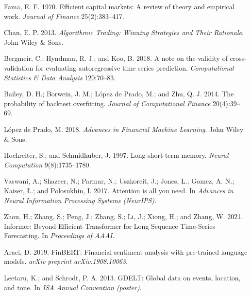\documentclass[letterpaper]{article} %
\begin{document}
\begin{thebibliography}{}
Fama, E. F. 1970.
Efficient capital markets: A review of theory and empirical work.
\textit{Journal of Finance} 25(2):383--417.

Chan, E. P. 2013.
\textit{Algorithmic Trading: Winning Strategies and Their Rationale}.
John Wiley \& Sons.

Bergmeir, C.; Hyndman, R. J.; and Koo, B. 2018.
A note on the validity of cross-validation for evaluating autoregressive time series prediction.
\textit{Computational Statistics \& Data Analysis} 120:70--83.

Bailey, D. H.; Borwein, J. M.; López de Prado, M.; and Zhu, Q. J. 2014.
The probability of backtest overfitting.
\textit{Journal of Computational Finance} 20(4):39--69.

López de Prado, M. 2018.
\textit{Advances in Financial Machine Learning}.
John Wiley \& Sons.

Hochreiter, S.; and Schmidhuber, J. 1997.
Long short-term memory.
\textit{Neural Computation} 9(8):1735--1780.

Vaswani, A.; Shazeer, N.; Parmar, N.; Uszkoreit, J.; Jones, L.; Gomez, A. N.; Kaiser, \L.; and Polosukhin, I. 2017.
Attention is all you need.
In \textit{Advances in Neural Information Processing Systems (NeurIPS)}.

Zhou, H.; Zhang, S.; Peng, J.; Zhang, S.; Li, J.; Xiong, H.; and Zhang, W. 2021.
Informer: Beyond Efficient Transformer for Long Sequence Time-Series Forecasting.
In \textit{Proceedings of AAAI}.

Araci, D. 2019.
FinBERT: Financial sentiment analysis with pre-trained language models.
\textit{arXiv preprint arXiv:1908.10063}.

Leetaru, K.; and Schrodt, P. A. 2013.
GDELT: Global data on events, location, and tone.
In \textit{ISA Annual Convention (poster)}.
\end{thebibliography}
\end{document}
